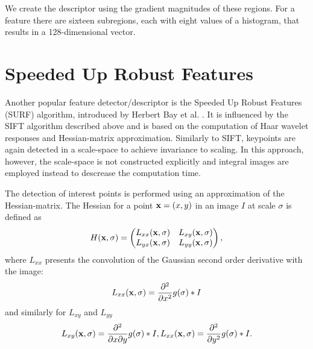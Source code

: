  We create the descriptor using the gradient magnitudes of these regions.
For a feature there are sixteen subregions, each with eight values of a histogram, that results in a 128-dimensional vector.


\section{Speeded Up Robust Features}
Another popular feature detector/descriptor is the Speeded Up Robust Features (SURF) algorithm, introduced by Herbert Bay et al. \cite{surf2006}. 
It is influenced by the SIFT algorithm described above and is based on the computation of Haar wavelet responses and Hessian-matrix approximation. 
Similarly to SIFT, keypoints are again detected in a scale-space to achieve invariance to scaling. 
In this approach, however, the scale-space is not constructed explicitly and integral images are employed instead to descrease the computation time. %

The detection of interest points is performed using an approximation of the Hessian-matrix.
The Hessian for a point $\mathbf{x} = (x, y)$ in an image $I$ at scale $\sigma$ is defined as
$$H(\mathbf{x}, \sigma) = \begin{pmatrix} 
L_{xx}(\mathbf{x}, \sigma) & L_{xy}(\mathbf{x}, \sigma) \\ 
L_{yx}(\mathbf{x}, \sigma) & L_{yy}(\mathbf{x}, \sigma)
\end{pmatrix},$$
where $L_{xx}$ presents the convolution of the Gaussian second order derivative with the image:
\[
L_{xx}(\mathbf{x}, \sigma) = \frac{\partial ^{2}}{\partial x^{2}}g(\sigma) * I
\]
and similarly for $L_{xy}$ and $L_{yy}$
\[
L_{xy}(\mathbf{x}, \sigma) = \frac{\partial ^{2}}{\partial x \partial y}g(\sigma) * I, 
L_{xx}(\mathbf{x}, \sigma) = \frac{\partial ^{2}}{\partial y^{2}}g(\sigma) * I.
\]

